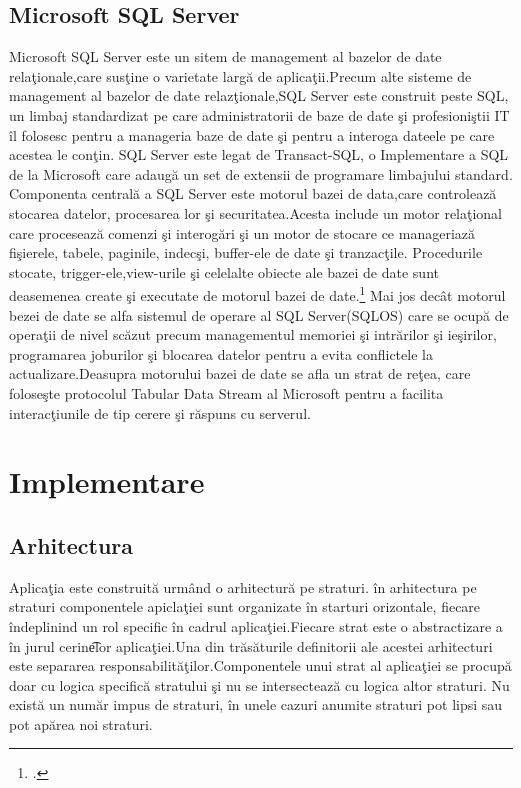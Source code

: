 \documentclass[a4paper,12pt]{report}
\begin{document}
\section{Microsoft SQL Server}
Microsoft SQL Server este un sitem de management al bazelor de date rela\c tionale,care sus\c tine o varietate
larg\u a de aplica\c tii.Precum alte sisteme de management al bazelor de date relaz\c tionale,SQL Server
este construit peste SQL, un limbaj standardizat pe care administratorii de baze de date \c si profesioni\c stii IT
\^il folosesc pentru a manageria baze de date \c si pentru a interoga dateele pe care acestea le con\c tin.
SQL Server este legat de Transact-SQL, o Implementare a SQL de la Microsoft care adaug\u a un set de extensii 
de programare limbajului standard.
Componenta central\u a a SQL Server este motorul bazei de data,care controleaz\u a stocarea datelor, procesarea lor
\c si securitatea.Acesta include un motor rela\c tional care proceseaz\u a comenzi \c si interog\u ari \c si 
un motor de stocare ce manageriaz\u a fi\c sierele, tabele, paginile, indec\c si, buffer-ele de date \c si tranzac\c tile.
Procedurile stocate, trigger-ele,view-urile \c si celelalte obiecte ale bazei de date sunt deasemenea create \c si executate 
de motorul bazei de date.\footcite{sqlServer}
Mai jos dec\^at motorul bezei de date se alfa sistemul de operare al SQL Server(SQLOS) care se ocup\u a
de opera\c tii de nivel sc\u azut precum managementul memoriei \c si intr\u arilor \c si ie\c sirilor, programarea joburilor 
\c si blocarea datelor pentru a evita conflictele la actualizare.Deasupra motorului bazei de date se afla un strat de re\c tea,
care folose\c ste protocolul Tabular Data Stream al Microsoft pentru a facilita interac\c tiunile de tip cerere \c si r\u aspuns
cu serverul.

\chapter{Implementare}

\section{Arhitectura}

Aplica\c tia este construit\u a urm\^and o arhitectur\u a pe straturi.
\^in arhitectura pe straturi componentele apicla\c tiei sunt organizate \^in starturi orizontale,
fiecare \^indeplinind un rol specific \^in cadrul aplica\c tiei.Fiecare strat este o abstractizare 
a \^in jurul cerin\t elor aplica\c tiei.Una din tr\u as\u aturile definitorii ale acestei arhitecturi
este separarea responsabilit\u a\c tilor.Componentele unui strat al aplica\c tiei se procup\u a doar 
cu logica specific\u a stratului \c si nu se intersecteaz\u a cu logica altor straturi.
Nu exist\u a un num\u ar impus de straturi, \^in unele cazuri anumite straturi pot lipsi sau pot 
ap\u area noi straturi.
\end{document}
